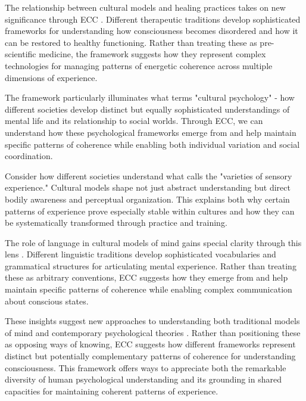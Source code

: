 The relationship between cultural models and healing practices takes on new significance through ECC \cite{csordas1994sacred}. Different therapeutic traditions develop sophisticated frameworks for understanding how consciousness becomes disordered and how it can be restored to healthy functioning. Rather than treating these as pre-scientific medicine, the framework suggests how they represent complex technologies for managing patterns of energetic coherence across multiple dimensions of experience.

The framework particularly illuminates what \cite{shweder1991thinking} terms "cultural psychology" - how different societies develop distinct but equally sophisticated understandings of mental life and its relationship to social worlds. Through ECC, we can understand how these psychological frameworks emerge from and help maintain specific patterns of coherence while enabling both individual variation and social coordination.

Consider how different societies understand what \cite{desjarlais1992body} calls the "varieties of sensory experience." Cultural models shape not just abstract understanding but direct bodily awareness and perceptual organization. This explains both why certain patterns of experience prove especially stable within cultures and how they can be systematically transformed through practice and training.

The role of language in cultural models of mind gains special clarity through this lens \cite{roepstorff2008things}. Different linguistic traditions develop sophisticated vocabularies and grammatical structures for articulating mental experience. Rather than treating these as arbitrary conventions, ECC suggests how they emerge from and help maintain specific patterns of coherence while enabling complex communication about conscious states.

These insights suggest new approaches to understanding both traditional models of mind and contemporary psychological theories \cite{turner1967forest}. Rather than positioning these as opposing ways of knowing, ECC suggests how different frameworks represent distinct but potentially complementary patterns of coherence for understanding consciousness. This framework offers ways to appreciate both the remarkable diversity of human psychological understanding and its grounding in shared capacities for maintaining coherent patterns of experience.